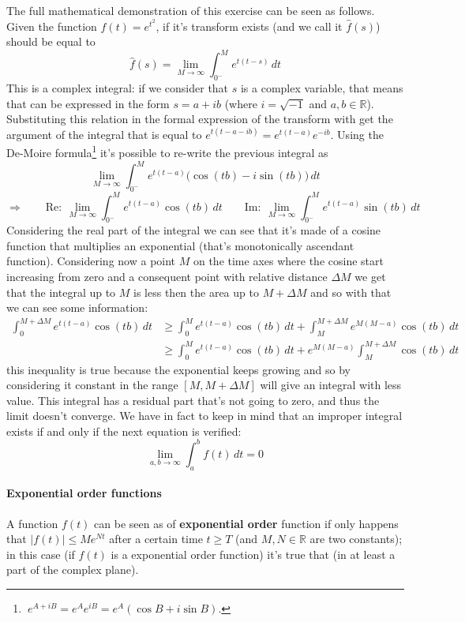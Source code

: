 	\begin{demonstration}
		The full mathematical demonstration of this exercise can be seen as follows. Given the function $f(t) = e^{t^2}$, if it's transform exists (and we call it $\hat f(s)$) should be equal to
		\[  \hat f(s) = \lim_{M\rightarrow \infty} \int_{0^-}^M e^{t(t-s)} \, dt \]
		This is a complex integral: if we consider that $s$ is a complex variable, that means that can be expressed in the form $s = a + ib$ (where $i=\sqrt{-1}$ and $a,b\in \mathds R$). Substituting this relation in the formal expression of the transform with get the argument of the integral that is equal to $e^{t(t-a-ib)} = e^{t(t-a)} e^{-ib}$. Using the De-Moire formula\footnote{$\ e^{A+iB} = e^A e^{iB} = e^A(\cos B + i \sin B)$. } it's possible to re-write the previous integral as		
		\[  \lim_{M\rightarrow \infty} \int_{0^-}^M e^{t(t-a)} \Big( \cos (tb) - i \sin(tb)  \Big) \, dt \]
		\[ \Rightarrow \qquad \textrm{Re}: \ \lim_{M\rightarrow \infty} \int_{0^-}^M e^{t(t-a)} \cos (tb) \, dt \qquad 
		\textrm{Im}: \ \lim_{M\rightarrow \infty} \int_{0^-}^M e^{t(t-a)} \sin (tb) \, dt \]
		Considering the real part of the integral we can see that it's made of a cosine function that multiplies an exponential (that's monotonically ascendant function). Considering now a point $M$ on the time axes where the cosine start increasing from zero and a consequent point with relative distance $\Delta M$ we get that the integral up to $M$ is less then the area up to $M+\Delta M$ and so with that we can see some information:
		\begin{align*}
			\int_0^{M+\Delta M} e^{t(t-a)} \cos(tb)\, dt & \geq \int_0^M e^{t(t-a)} \cos(tb)\, dt + \int_M^{M+\Delta M} e^{M(M-a)} \cos(tb)\, dt \\
			& \geq \int_0^M e^{t(t-a)} \cos(tb)\, dt + e^{M(M-a)} \int_M^{M+\Delta M} \cos(tb)\, dt 
		\end{align*}
		this inequality is true because the exponential keeps growing and so by considering it constant in the range $[M,M+\Delta M]$ will give an integral with less value. This integral has a residual part that's not going to zero, and thus the limit doesn't converge. We have in fact to keep in mind that an improper integral exists if and only if the next equation is verified:
		\begin{equation}
			\lim_{a,b \rightarrow \infty} \int_a^b f(t) \, dt = 0
		\end{equation}
	\end{demonstration}

	\paragraph{Exponential order functions} A function $f(t)$ can be seen as of \textbf{exponential order} function if only happens that $|f(t)| \leq M e^{Nt}$ after a certain time $t \geq T$ (and $M,N\in \mathds R$ are two constants); in this case (if $f(t)$ is a exponential order function) it's true that  (in at least a part of the complex plane).
	
